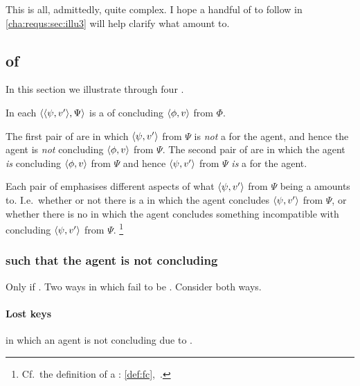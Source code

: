 \begin{note}
  This is all, admittedly, quite complex.
  I hope a handful of  to follow in \autoref{cha:requs:sec:illu3} will help clarify what  amount to.
\end{note}

\subsection{ of }
\label{cha:requs:sec:illu3}

\begin{note}
  In this section we illustrate  through four .

  In each  \(\langle \langle \psi, v' \rangle, \Psi \rangle\) is a \requ{} of concluding \(\langle \phi, v \rangle\) from \(\Phi\).

  The first pair of  are  in which \(\langle \psi, v' \rangle\) from \(\Psi\) is \emph{not} a \fc{} for the agent, and hence the agent is \emph{not} concluding \(\langle \phi, v \rangle\) from \(\Psi\).
  The second pair of  are  in which the agent \emph{is} concluding \(\langle \phi, v \rangle\) from \(\Psi\) and hence \(\langle \psi, v' \rangle\) from \(\Psi\) \emph{is} a \fc{} for the agent.

  Each pair of  emphasises different aspects of what \(\langle \psi, v' \rangle\) from \(\Psi\) being a \fc{} amounts to.
  I.e.\ whether or not there is a \pevent{} in which the agent concludes \(\langle \psi, v' \rangle\) from \(\Psi\), or whether there is no \pevent{} in which the agent concludes something incompatible with concluding \(\langle \psi, v' \rangle\) from \(\Psi\).%
  \footnote{
    Cf.\ the definition of a \fc{}: \autoref{def:fc},~.
  }
\end{note}

\subsubsection{ such that the agent is not concluding}

\begin{note}
  Only if \fc{}.
  Two ways in which fail to be \fc{}.
  Consider both ways.
\end{note}

\paragraph{Lost keys}

\begin{note}
   in which an agent is not concluding due to \requ{}.
\end{note}

